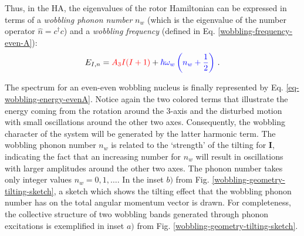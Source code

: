Thus, in the HA, the eigenvalues of the rotor Hamiltonian can be expressed in terms of a \emph{wobbling phonon number} $n_w$ (which is the eigenvalue of the number operator $\hat{n}=c^\dagger c$) and a \emph{wobbling frequency} (defined in Eq. \ref{wobbling-frequency-even-A}):
\begin{align}
    E_{I,n}={\color{red}A_3I(I+1)}+{\color{blue}\hbar\omega_w\left(n_w+\frac{1}{2}\right)}\ .
    \label{eq-wobbling-energy-evenA}
\end{align}

The spectrum for an even-even wobbling nucleus is finally represented by Eq. \ref{eq-wobbling-energy-evenA}. Notice again the two colored terms that illustrate the energy coming from the rotation around the $3$-axis and the disturbed motion with small oscillations around the other two axes. Consequently, the wobbling character of the system will be generated by the latter harmonic term. The wobbling phonon number $n_w$ is related to the `strength' of the tilting for $\mathbf{I}$, indicating the fact that an increasing number for $n_w$ will result in oscillations with larger amplitudes around the other two axes. The phonon number takes only integer values $n_w=0,1,\dots$. In the inset $b)$ from Fig. \ref{wobbling-geometry-tilting-sketch}, a sketch which shows the tilting effect that the wobbling phonon number has on the total angular momentum vector is drawn. For completeness, the collective structure of two wobbling bands generated through phonon excitations is exemplified in inset $a)$ from Fig. \ref{wobbling-geometry-tilting-sketch}.

